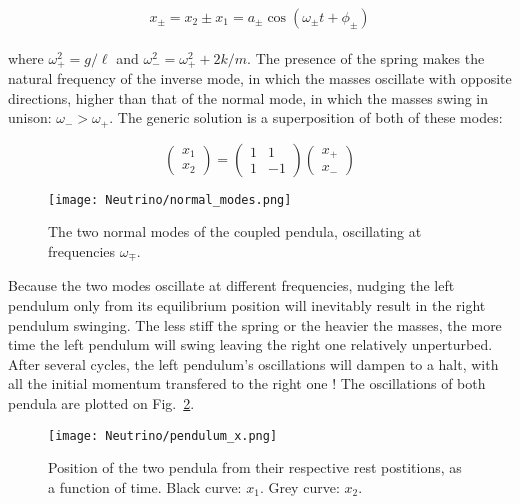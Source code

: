 \begin{equation}
x_{\pm} = x_2 \pm x_1 = a_{\pm} \cos \left( \omega_{\pm} t + \phi_{\pm} \right)
\end{equation} \\ where $\omega_{+}^2 = g / \ell$ and $\omega_{-}^2 = \omega_{+}^2 + 2 k / m$. The presence of the spring makes the natural frequency of the inverse mode, in which the masses oscillate with opposite directions, higher than that of the normal mode, in which the masses swing in unison: $\omega_{-} > \omega_{+}$. The generic solution is a superposition of both of these modes:

\begin{equation}
\label{eq:genericsol}
\left(  
\begin{matrix}
x_1 \\
x_2
\end{matrix}
\right) = \left(
\begin{matrix}
1 & 1\\
1 & -1
\end{matrix}
\right) \left(
\begin{matrix}
x_{+}\\
x_{-}
\end{matrix}
\right)
\end{equation}

\begin{figure}
\begin{center}
\texttt{[image: Neutrino/normal\_modes.png]}
\caption{The two normal modes of the coupled pendula, oscillating at frequencies $\omega_{\mp}$.}
\label{fig:normal_mode}
\end{center}
\end{figure}

Because the two modes oscillate at different frequencies, nudging the left pendulum only from its equilibrium position will inevitably result in the right pendulum swinging. The less stiff the spring or the heavier the masses, the more time the left pendulum will swing leaving the right one relatively unperturbed. After several cycles, the left pendulum's oscillations will dampen to a halt, with all the initial momentum transfered to the right one ! The oscillations of both pendula are plotted on Fig.~\ref{fig:trajectory_pendulum}. \\

\begin{figure}
\begin{center}
\texttt{[image: Neutrino/pendulum\_x.png]}
\caption{Position of the two pendula from their respective rest postitions, as a function of time. Black curve: $x_1$. Grey curve: $x_2$.}
\label{fig:trajectory_pendulum}
\end{center}
\end{figure}


